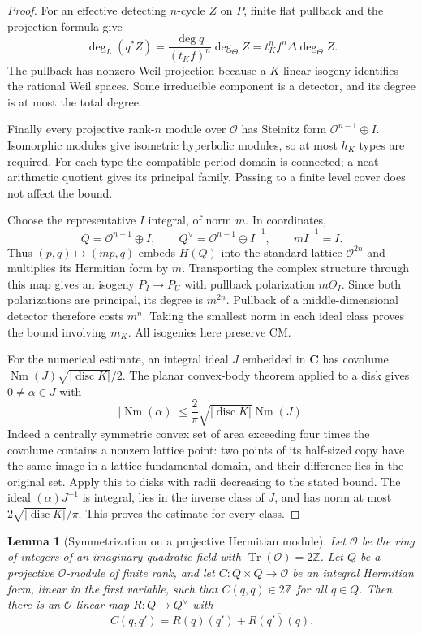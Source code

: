 \documentclass[11pt]{article}
\newtheorem{lemma}[theorem]{Lemma}
\theoremstyle{definition}
\theoremstyle{remark}
\newcommand{\C}{\mathbf C}
\begin{document}
\begin{proof}
For an effective detecting $n$-cycle $Z$ on $P$, finite flat pullback and the projection formula give
\[
 \deg_L(q^*Z)=\frac{\deg q}{(t_K f)^n}\deg_\Theta Z
             =t_K^n f^n\Delta\deg_\Theta Z.
\]
The pullback has nonzero Weil projection because a $K$-linear isogeny identifies the rational Weil spaces. Some irreducible component is a detector, and its degree is at most the total degree.

Finally every projective rank-$n$ module over $\mathcal O$ has Steinitz form $\mathcal O^{n-1}\oplus I$. Isomorphic modules give isometric hyperbolic modules, so at most $h_K$ types are required. For each type the compatible period domain is connected; a neat arithmetic quotient gives its principal family. Passing to a finite level cover does not affect the bound.

Choose the representative $I$ integral, of norm $m$. In coordinates,
\[
 Q=\mathcal O^{n-1}\oplus I,
 \qquad Q^\vee=\mathcal O^{n-1}\oplus\bar I^{-1},
 \qquad m\bar I^{-1}=I.
\]
Thus $(p,q)\mapsto(mp,q)$ embeds $H(Q)$ into the standard lattice $\mathcal O^{2n}$ and multiplies its Hermitian form by $m$. Transporting the complex structure through this map gives an isogeny $P_I\to P_U$ with pullback polarization $m\Theta_I$. Since both polarizations are principal, its degree is $m^{2n}$. Pullback of a middle-dimensional detector therefore costs $m^n$. Taking the smallest norm in each ideal class proves the bound involving $m_K$. All isogenies here preserve CM.

For the numerical estimate, an integral ideal $J$ embedded in $\C$ has covolume $\operatorname{Nm}(J)\sqrt{|\operatorname{disc}K|}/2$. The planar convex-body theorem applied to a disk gives $0\ne\alpha\in J$ with
\[
 |\operatorname{Nm}(\alpha)|\le
 \frac2\pi\sqrt{|\operatorname{disc}K|}\operatorname{Nm}(J).
\]
Indeed a centrally symmetric convex set of area exceeding four times the covolume contains a nonzero lattice point: two points of its half-sized copy have the same image in a lattice fundamental domain, and their difference lies in the original set. Apply this to disks with radii decreasing to the stated bound. The ideal $(\alpha)J^{-1}$ is integral, lies in the inverse class of $J$, and has norm at most $2\sqrt{|\operatorname{disc}K|}/\pi$. This proves the estimate for every class.
\end{proof}

\begin{lemma}[Symmetrization on a projective Hermitian module]
\label{principal-lem:even-symmetrization}
Let $\mathcal O$ be the ring of integers of an imaginary quadratic
field with $\operatorname{Tr}(\mathcal O)=2\mathbb Z$.
Let $Q$ be a projective $\mathcal O$-module of finite rank, and let
$C:Q\times Q\to\mathcal O$ be an integral Hermitian form, linear
in the first variable, such that $C(q,q)\in2\mathbb Z$ for all $q\in Q$.
Then there is an $\mathcal O$-linear map $R:Q\to Q^\vee$ with
\[
 C(q,q')=R(q)(q')+\overline{R(q')(q)}.
\]
\end{lemma}
\end{document}
